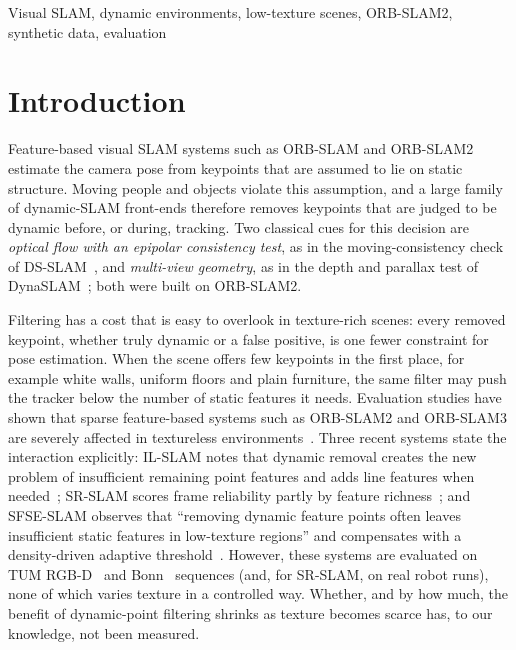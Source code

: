 \documentclass[conference]{IEEEtran}
\begin{document}
\begin{IEEEkeywords}
Visual SLAM, dynamic environments, low-texture scenes, ORB-SLAM2, synthetic data, evaluation
\end{IEEEkeywords}

\section{Introduction}
\label{sec:intro}

Feature-based visual SLAM systems such as ORB-SLAM and ORB-SLAM2~\cite{murartal2015orbslam,murartal2017orbslam2} estimate the camera pose from keypoints that are assumed to lie on static structure. Moving people and objects violate this assumption, and a large family of dynamic-SLAM front-ends therefore removes keypoints that are judged to be dynamic before, or during, tracking. Two classical cues for this decision are \emph{optical flow with an epipolar consistency test}, as in the moving-consistency check of DS-SLAM~\cite{yu2018dsslam}, and \emph{multi-view geometry}, as in the depth and parallax test of DynaSLAM~\cite{bescos2018dynaslam}; both were built on ORB-SLAM2.

Filtering has a cost that is easy to overlook in texture-rich scenes: every removed keypoint, whether truly dynamic or a false positive, is one fewer constraint for pose estimation. When the scene offers few keypoints in the first place, for example white walls, uniform floors and plain furniture, the same filter may push the tracker below the number of static features it needs. Evaluation studies have shown that sparse feature-based systems such as ORB-SLAM2 and ORB-SLAM3 are severely affected in textureless environments~\cite{bujanca2021robust}. Three recent systems state the interaction explicitly: IL-SLAM notes that dynamic removal creates the new problem of insufficient remaining point features and adds line features when needed~\cite{zhang2025ilslam}; SR-SLAM scores frame reliability partly by feature richness~\cite{zhang2025srslam}; and SFSE-SLAM observes that ``removing dynamic feature points often leaves insufficient static features in low-texture regions'' and compensates with a density-driven adaptive threshold~\cite{li2026sfse}. However, these systems are evaluated on TUM RGB-D~\cite{sturm2012tum} and Bonn~\cite{palazzolo2019refusion} sequences (and, for SR-SLAM, on real robot runs), none of which varies texture in a controlled way. Whether, and by how much, the benefit of dynamic-point filtering shrinks as texture becomes scarce has, to our knowledge, not been measured.
\end{document}

